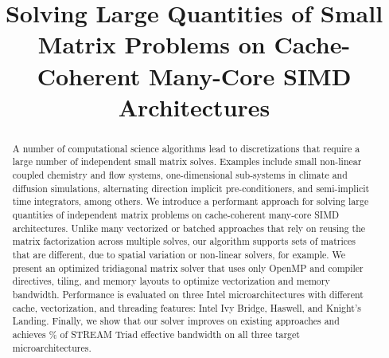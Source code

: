\documentclass[10pt, conference, compsocconf]{IEEEtran}
\newcommand{\textapprox}{\texttildelow}
\begin{document}
\title{Solving Large Quantities of Small Matrix Problems on Cache-Coherent Many-Core SIMD Architectures}

\author{
}


\maketitle

\thispagestyle{plain}
\pagestyle{plain}

\begin{abstract}
A number of computational science algorithms lead to discretizations
  that require a large number of independent small matrix solves.
Examples include small non-linear coupled chemistry and flow systems,
  one-dimensional sub-systems in climate and diffusion simulations, 
  alternating direction implicit pre-conditioners, and 
  semi-implicit time integrators, among others.
We introduce a performant approach for solving large quantities of 
  independent matrix problems on cache-coherent many-core SIMD architectures.
Unlike many vectorized or batched approaches that rely on reusing
  the matrix factorization across multiple solves, our algorithm supports
  sets of matrices that are different, due to
  spatial variation or non-linear solvers, for example.
We present an optimized tridiagonal matrix solver that uses only OpenMP and
  compiler directives, tiling, and memory layouts to optimize vectorization and
  memory bandwidth.
Performance is evaluated on three Intel microarchitectures with different
  cache, vectorization, and threading features: Intel Ivy Bridge, Haswell, and
  Knight's Landing.
Finally, we show that our solver improves on existing approaches and achieves
  \textapprox 90\% of STREAM Triad effective bandwidth on all three target
  microarchitectures.
\end{abstract}
\end{document}
